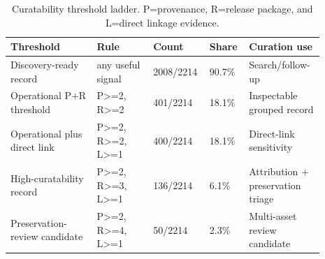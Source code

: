 \begin{table}[t]
\centering
\caption{Curatability threshold ladder. P=provenance, R=release package, and L=direct linkage evidence.}
\label{tab:threshold-rationale-main}
\small
\setlength{\tabcolsep}{3pt}
\begin{tabular}{@{}p{0.26\linewidth}p{0.17\linewidth}p{0.14\linewidth}p{0.10\linewidth}p{0.22\linewidth}@{}}
\toprule
Threshold & Rule & Count & Share & Curation use \\
\midrule
Discovery-ready record & any useful signal & 2008/2214 & 90.7\% & Search/follow-up \\
Operational P+R threshold & P>=2, R>=2 & 401/2214 & 18.1\% & Inspectable grouped record \\
Operational plus direct link & P>=2, R>=2, L>=1 & 400/2214 & 18.1\% & Direct-link sensitivity \\
High-curatability record & P>=2, R>=3, L>=1 & 136/2214 & 6.1\% & Attribution + preservation triage \\
Preservation-review candidate & P>=2, R>=4, L>=1 & 50/2214 & 2.3\% & Multi-asset review candidate \\
\bottomrule
\end{tabular}
\end{table}
